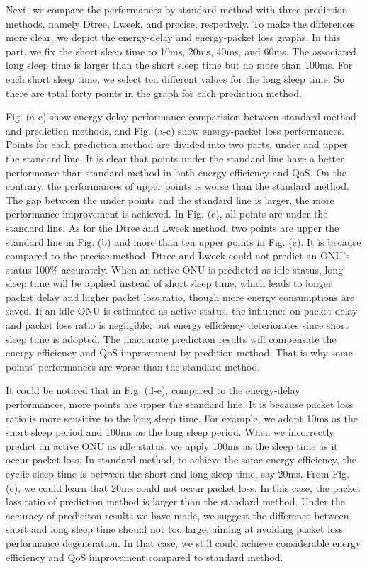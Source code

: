 \documentclass[journal]{IEEEtran}
\begin{document}
Next, we compare the performances by standard method with three prediction methods, namely Dtree, Lweek, and precise, respetively. To make the differences more clear, we depict the energy-delay and energy-packet loss graphs. In this part, we fix the short sleep time to 10ms, 20ms, 40ms, and 60ms. The associated long sleep time is larger than the short sleep time but no more than 100ms. For each short sleep time, we select ten different values for the long sleep time. So there are total forty points in the graph for each prediction method. 

Fig. (a-c) show energy-delay performance comparision between standard method and prediction methods, and Fig. (a-c) show energy-packet loss performances. Points for each prediction method are divided into two parts, under and upper the standard line. It is clear that points under the standard line have a better performance than standard method in both energy efficiency and QoS. On the contrary, the performances of upper points is worse than the standard method. The gap between the under points and the standard line is larger, the more performance improvement is achieved. In Fig. (c), all points are under the standard line. As for the Dtree and Lweek method, two points are upper the standard line in Fig. (b) and more than ten upper points in Fig. (c). It is because compared to the precise method, Dtree and Lweek could not predict an ONU's status 100\% accurately. When an active ONU is predicted as idle status, long sleep time will be applied instead of short sleep time, which leads to longer packet delay and higher packet loss ratio, though more energy consumptions are saved. If an idle ONU is estimated as active status, the influence on packet delay and packet loss ratio is negligible, but energy efficiency deteriorates since short sleep time is adopted. The inaccurate prediction results will compensate the energy efficiency and QoS improvement by predition method. That is why some points' performances are worse than the standard method.

It could be noticed that in Fig. (d-e), compared to the energy-delay performances, more points are upper the standard line. It is because packet loss ratio is more sensitive to the long sleep time. For example, we adopt 10ms as the short sleep period and 100ms as the long sleep period. When we incorrectly predict an active ONU as idle status, we apply 100ms as the sleep time as it occur packet loss. In standard method, to achieve the same energy efficiency, the cyclic sleep time is between the short and long sleep time, say 20ms. From Fig. (c), we could learn that 20ms could not occur packet loss. In this case, the packet loss ratio of prediction method is larger than the standard method. Under the accuracy of prediciton results we have made, we suggest the difference between short and long sleep time should not too large, aiming at avoiding packet loss performance degeneration. In that case, we still could achieve considerable energy efficiency and QoS improvement compared to standard method.
\end{document}
